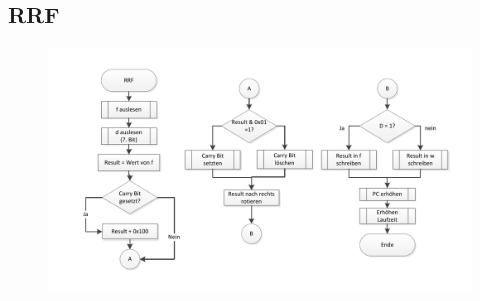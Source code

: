 \newpage
\subsection{RRF}


\begin{figure}[h]
\centering
\includegraphics[scale=0.7]{Diag/RRF.pdf}
\end{figure}

